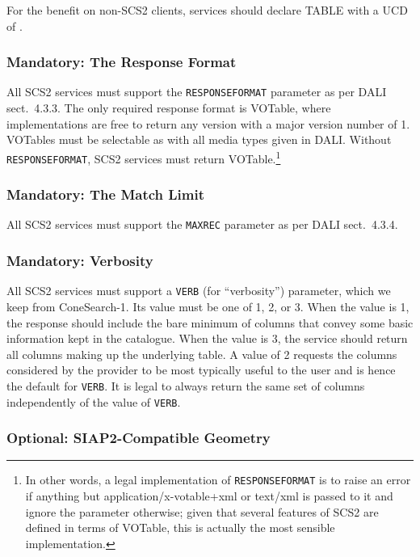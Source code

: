 \documentclass[11pt,a4paper]{ivoa}
\begin{document}
For the benefit on non-SCS2 clients, services should declare TABLE with
a UCD of .

\subsubsection{Mandatory: The Response Format}

All SCS2 services must support the \verb|RESPONSEFORMAT| parameter as
per DALI sect.~4.3.3.  The only required response format is VOTable,
where implementations are free to return any version with a major
version number of 1.  VOTables must be selectable as with all media
types given in DALI.  Without \verb|RESPONSEFORMAT|, SCS2 services must return
VOTable.\footnote{In other words, a legal
implementation of \texttt{RESPONSEFORMAT} is to raise an error if anything but
application/x-votable+xml or text/xml is passed to it and ignore the
parameter otherwise; given that several features of SCS2 are defined in
terms of VOTable, this is actually the most sensible implementation.}

\subsubsection{Mandatory: The Match Limit}

All SCS2 services must support the \verb|MAXREC| parameter as per DALI
sect.~4.3.4.

\subsubsection{Mandatory: Verbosity}

All SCS2 services must support a \verb|VERB| (for ``verbosity'')
parameter, which we keep from ConeSearch-1.  Its value must be one of 1, 2, or
3.  When the value is 1, the response should include the bare minimum of
columns that convey some basic information kept in the catalogue.  When
the value is 3, the service should return all columns making up the
underlying table.  A value of 2 requests the columns considered by the
provider to be most typically useful to the user and is hence the
default for \verb|VERB|.   It is legal to
always return the same set of columns independently of the value of
\verb|VERB|.

\subsubsection{Optional: SIAP2-Compatible Geometry}
\end{document}
